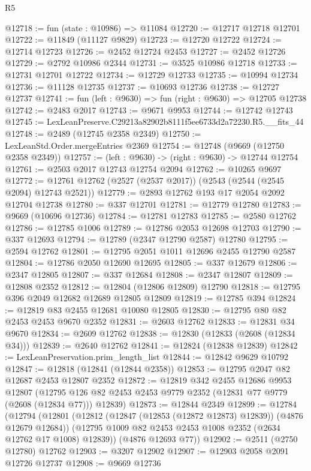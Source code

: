 \begin{lexlean}{R5}
\begin{coremodule}
@12718 := fun (state : @10986) => @11084
@12720 := @12717 @12718 @12701
@12722 := @11849 (@11127 @9829)
@12723 := @12720 @12722
@12724 := @12714 @12723
@12726 := @2452 @12724 @2453
@12727 := @2452 @12726
@12729 := @2792 @10986 @2344
@12731 := @3525 @10986 @12718
@12733 := @12731 @12701 @12722
@12734 := @12729 @12733
@12735 := @10994 @12734
@12736 := @11128 @12735
@12737 := @10693 @12736
@12738 := @12727 @12737
@12741 := fun (left : @9630) => fun (right : @9630) => @12705 @12738
@12742 := @2483 @2017
@12743 := @9671 @9953
@12744 := @12742 @12743
@12745 := LexLeanPreserve.C29213a82902b8111f5ee6733d2a72230.R5.__fits_44
@12748 := @2489 (@12745 @2358 @2349)
@12750 := LexLeanStd.Order.mergeEntries @2369
@12754 := @12748 (@9669 (@12750 @2358 @2349))
@12757 := (left : @9630) -> (right : @9630) -> @12744 @12754
@12761 := @2503 @2017 @12743 @12754 @2094
@12762 := @10265 @9697
@12772 := @12761 @12762 (@2527 (@2537 @2017)) (@2543 (@2544 (@2545 @2094) @12743 @2521))
@12779 := @2893 @12762 @193 @17 @2054 @2092 @12704 @12738
@12780 := @337 @12701
@12781 := @12779 @12780
@12783 := @9669 (@10696 @12736)
@12784 := @12781 @12783
@12785 := @2580 @12762
@12786 := @12785 @1006
@12789 := @12786 @2053 @12698 @12703
@12790 := @337 @12693
@12794 := @12789 (@2347 @12790 @2587) @12780
@12795 := @2594 @12762
@12801 := @12795 @2051 @1011 @12696 @2455 @12790 @2587
@12804 := @12786 @2050 @12690 @12695
@12805 := @337 @12679
@12806 := @2347 @12805
@12807 := @337 @12684
@12808 := @2347 @12807
@12809 := @12808 @2352
@12812 := @12804 (@12806 @12809) @12790
@12818 := @12795 @396 @2049 @12682 @12689 @12805 @12809
@12819 := @12785 @394
@12824 := @12819 @83 @2455 @12681 @10080 @12805
@12830 := @12795 @80 @82 @2453 @2453 @9670 @2352
@12831 := @2603 @12762
@12833 := @12831 @34 @9670
@12834 := @2609 @12762
@12838 := @12830 (@12833 (@2608 (@12834 @34)))
@12839 := @2640 @12762
@12841 := @12824 (@12838 @12839)
@12842 := LexLeanPreservation.prim_length_list
@12844 := @12842 @9629 @10792
@12847 := @12818 (@12841 (@12844 @2358))
@12853 := @12795 @2047 @82 @12687 @2453 @12807 @2352
@12872 := @12819
    @342
    @2455
    @12686
    @9953
    @12807
    (@12795 @126 @82 @2453 @2453 @9779 @2352 (@12831 @77 @9779 (@2608 (@12834 @77))) @12839)
@12873 := @12844 @2349
@12899 := @12784
    (@12794
      (@12801
        (@12812 (@12847 (@12853 (@12872 @12873) @12839)) (@4876 @12679 @12684))
        (@12795 @1009 @82 @2453 @2453 @1008 @2352 (@2634 @12762 @17 @1008) @12839))
      (@4876 @12693 @77))
@12902 := @2511 (@2750 @12780) @12762
@12903 := @3207 @12902
@12907 := @12903 @2058 @2091 @12726 @12737
@12908 := @9669 @12736

\end{coremodule}
\end{lexlean}
